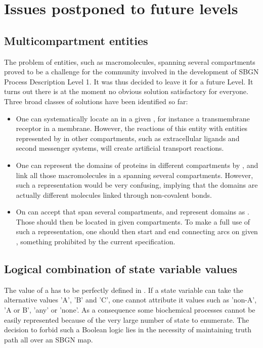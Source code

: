 \chapter{Issues postponed to future levels}\label{sec:postponed}

\section{Multicompartment entities}
\label{sec:techref:unresolved_multi-comp_ents}

The problem of entities, such as macromolecules, spanning several compartments proved to be a challenge for the community involved in the development of SBGN Process Description Level 1. It was thus decided to leave it for a future Level. It turns out there is at the moment no obvious solution satisfactory for everyone. Three broad classes of solutions have been identified so far:

\begin{itemize}
\item One can systematically locate an  in a given , for instance a transmembrane receptor in a membrane. However, the reactions of this entity with entities represented by  in other compartments, such as extracellular ligands and second messenger systems, will create artificial transport reactions.
\item One can represent the domains of proteins in different compartments by , and link all those macromolecules in a  spanning several compartments. However, such a representation would be very confusing, implying that the domains are actually different molecules linked through non-covalent bonds.
\item On can accept  that span several compartments, and represent domains as . Those  should then be located in given compartments. To make a full use of such a representation, one should then start and end connecting arcs on given , something prohibited by the current specification.
\end{itemize}

\section{Logical combination of state variable values}

The value of a  has to be perfectly defined in \SBGNPDLone. If a state variable can take the alternative values 'A', 'B' and 'C',  one cannot attribute it values such as 'non-A', 'A or B', 'any' or 'none'. As a consequence some biochemical processes cannot be easily represented because of the very large number of state to enumerate. The decision to forbid such a Boolean logic lies in the necessity of maintaining truth path all over an SBGN map. 

